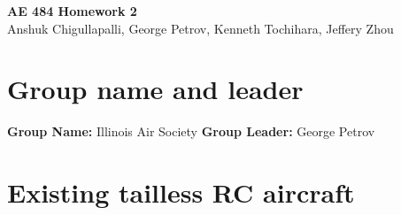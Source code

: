




\begin{center}
    {\Large\textbf{AE 484 Homework 2}}\\
    Anshuk Chigullapalli, George Petrov, Kenneth Tochihara, Jeffery Zhou\\
\end{center}


\section{Group name and leader}

    \textbf{Group Name:} Illinois Air Society %
    \textbf{Group Leader:} George Petrov %

\section{Existing tailless RC aircraft}

